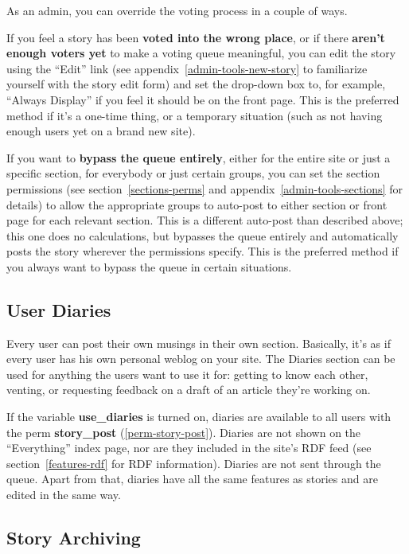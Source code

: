 As an admin, you can override the voting process in a couple of ways.

If you feel a story has been {\bf voted into the wrong place}, or if there {\bf aren't enough voters yet} to make a voting queue meaningful, you can edit the story using the ``Edit'' link (see appendix~\ref{admin-tools-new-story} to familiarize yourself with the story edit form) and set the drop-down box to, for example, ``Always Display'' if you feel it should be on the front page.  This is the preferred method if it's a one-time thing, or a temporary situation (such as not having enough users yet on a brand new site).

If you want to {\bf bypass the queue entirely}, either for the entire site or just a specific section, for everybody or just certain groups, you can set the section permissions (see section~\ref{sections-perms} and appendix~\ref{admin-tools-sections} for details) to allow the appropriate groups to auto-post to either section or front page for each relevant section.  This is a different auto-post than described above; this one does no calculations, but bypasses the queue entirely and automatically posts the story wherever the permissions specify.  This is the preferred method if you always want to bypass the queue in certain situations.

\subsection{User Diaries}
\label{features-diaries}

Every user can post their own musings in their own section.  Basically, it's as if every user has his own personal weblog on your site.  The Diaries section can be used for anything the users want to use it for: getting to know each other, venting, or requesting feedback on a draft of an article they're working on.

If the variable {\bf use\_diaries} is turned on, diaries are available to all users with the perm {\bf story\_post} (\ref{perm-story-post}).  Diaries are not shown on the ``Everything'' index page, nor are they included in the site's RDF feed (see section~\ref{features-rdf} for RDF information).  Diaries are not sent through the queue.  Apart from that, diaries have all the same features as stories and are edited in the same way.

\subsection{Story Archiving}
\label{features-archive}

